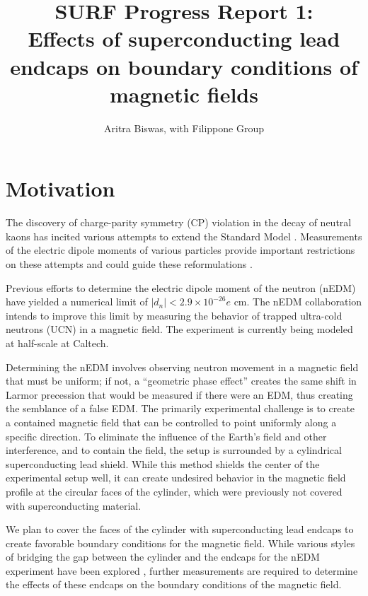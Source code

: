 \documentclass[twocolumn,aps,prb,citeautoscript]{revtex4-1}
\begin{document}
\title{SURF Progress Report 1:\\
Effects of superconducting lead endcaps on boundary conditions of
magnetic fields}
\author{Aritra Biswas, with Filippone Group}



\maketitle

\section{Motivation}
The discovery of charge-parity symmetry (CP) violation 
in the decay of neutral kaons has incited various attempts to extend the
Standard Model \cite{cpv}. Measurements of the electric
dipole moments of various particles provide important restrictions on these
attempts and could guide these reformulations \cite{ill}.

Previous efforts \cite{ill} to determine the electric dipole
moment  of the neutron (nEDM)
have yielded a numerical limit of $|d_n| < 2.9 \times 10^{-26}e\text{ cm}$.
The nEDM collaboration intends to
improve this limit \cite{krl} by measuring the behavior of trapped
ultra-cold neutrons (UCN) in a magnetic field.
The experiment is currently being modeled at
half-scale at Caltech.

Determining the nEDM involves observing neutron movement in a magnetic field
that must be uniform; if not, a
``geometric phase effect'' creates the same shift in Larmor precession
that would be measured if there were an EDM, thus creating the semblance
of a false EDM\cite{coil}.
The primarily experimental challenge is to create a contained magnetic field
that can be controlled to point uniformly along a specific direction. To
eliminate
the influence of the Earth's field and other interference, and to contain
the field, the setup is surrounded by a cylindrical
superconducting lead shield. While
this method shields the center of the experimental setup well,
it can create undesired behavior
in the magnetic field profile at the circular faces of the cylinder, which
were previously not covered with superconducting material.

We plan to cover the faces of the cylinder with superconducting lead endcaps
to create favorable boundary conditions for the magnetic field.
While various styles of bridging the gap between the cylinder and the endcaps
for the nEDM experiment have
been explored \cite{endcapstyles}, further measurements are required to
determine the effects of these endcaps on the boundary conditions of
the magnetic field.
\end{document}
